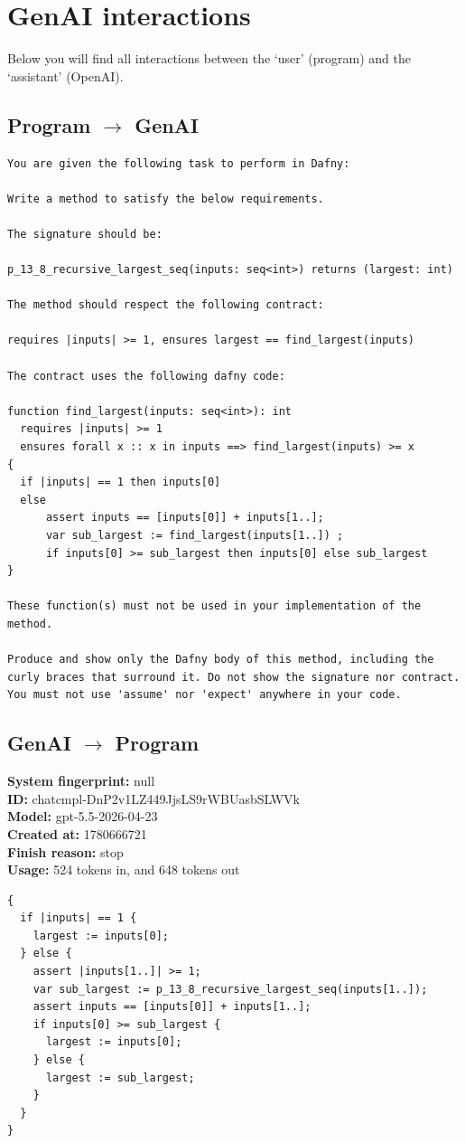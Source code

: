 \documentclass{article}
\begin{document}
\section*{GenAI interactions}
Below you will find all interactions between the `user' (program) and the `assistant' (OpenAI).
\subsection*{Program $\rightarrow$ GenAI}
\begin{lstlisting}
You are given the following task to perform in Dafny:

Write a method to satisfy the below requirements.

The signature should be:

p_13_8_recursive_largest_seq(inputs: seq<int>) returns (largest: int)

The method should respect the following contract:

requires |inputs| >= 1, ensures largest == find_largest(inputs)

The contract uses the following dafny code:

function find_largest(inputs: seq<int>): int
  requires |inputs| >= 1
  ensures forall x :: x in inputs ==> find_largest(inputs) >= x
{
  if |inputs| == 1 then inputs[0]
  else 
      assert inputs == [inputs[0]] + inputs[1..];
      var sub_largest := find_largest(inputs[1..]) ;
      if inputs[0] >= sub_largest then inputs[0] else sub_largest
}

These function(s) must not be used in your implementation of the method.

Produce and show only the Dafny body of this method, including the curly braces that surround it. Do not show the signature nor contract. You must not use 'assume' nor 'expect' anywhere in your code.
\end{lstlisting}
\subsection*{GenAI $\rightarrow$ Program}
\textbf{System fingerprint: }null
\\\textbf{ID: }chatcmpl-DnP2v1LZ449JjsLS9rWBUasbSLWVk
\\\textbf{Model: }gpt-5.5-2026-04-23
\\\textbf{Created at: }1780666721
\\\textbf{Finish reason: }stop
\\\textbf{Usage: }524 tokens in, and 648 tokens out
\begin{lstlisting}
{
  if |inputs| == 1 {
    largest := inputs[0];
  } else {
    assert |inputs[1..]| >= 1;
    var sub_largest := p_13_8_recursive_largest_seq(inputs[1..]);
    assert inputs == [inputs[0]] + inputs[1..];
    if inputs[0] >= sub_largest {
      largest := inputs[0];
    } else {
      largest := sub_largest;
    }
  }
}
\end{lstlisting}
\end{document}

